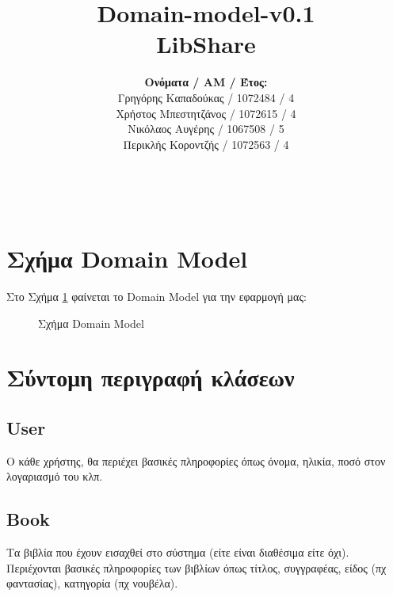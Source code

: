 \documentclass[12pt,a4paper]{article}
\title{Domain-model-v0.1 \\ LibShare}
\author{\textbf{Ονόματα / ΑΜ / Έτος:} \\ Γρηγόρης Καπαδούκας / 1072484 / 4\textdegree \\ Χρήστος Μπεστητζάνος / 1072615 / 4\textdegree \\ Νικόλαος Αυγέρης / 1067508 / 5\textdegree \\ Περικλής Κοροντζής / 1072563 / 4\textdegree}
\begin{document}
\makeatletter
\begin{center}
	\LARGE{\@title} \\
	\pagebreak
    \begin{LARGE}\@author\end{LARGE} 
    \pagebreak
\end{center}

\section{Σχήμα Domain Model}

Στο Σχήμα \ref{Σχήμα Domain Model} φαίνεται το Domain Model για την εφαρμογή μας:

\begin{figure}[H]
	\caption{Σχήμα Domain Model}
	\label{Σχήμα Domain Model}
\end{figure}

\section{Σύντομη περιγραφή κλάσεων}

\subsection{User}
Ο κάθε χρήστης, θα περιέχει βασικές πληροφορίες όπως όνομα, ηλικία, ποσό στον λογαριασμό του κλπ.

\subsection{Book}
Τα βιβλία που έχουν εισαχθεί στο σύστημα (είτε είναι διαθέσιμα είτε όχι). Περιέχονται βασικές πληροφορίες των βιβλίων όπως τίτλος, συγγραφέας, είδος (πχ φαντασίας), κατηγορία (πχ νουβέλα).
\end{document}
